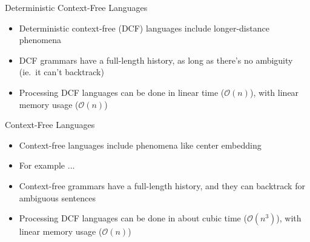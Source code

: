 \documentclass{beamer}
\newcommand{\detail}[1]{{\color{lightgrey}\small{}#1}}
\begin{document}
\begin{frame}{Deterministic Context-Free Languages}
\begin{block}{}
\begin{itemize}
	\item Deterministic context-free (DCF) languages include longer-distance phenomena
	\item DCF grammars have a full-length history, as long as there's no ambiguity (ie.\ it can't backtrack)
	\pause
	\item Processing DCF languages can be done in linear time \detail{($\mathcal{O}(n)$)}, with linear memory usage \detail{($\mathcal{O}(n)$)}
\end{itemize}
\end{block}
\end{frame}


\begin{frame}{Context-Free Languages}
\begin{block}{}
\begin{itemize}
	\item Context-free languages include phenomena like center embedding
	\item For example ...
	\pause
	\item Context-free grammars have a full-length history, and they can backtrack for ambiguous sentences
	\pause
	\item Processing DCF languages can be done in about cubic time \detail{($\mathcal{O}(n^3)$)}, with linear memory usage \detail{($\mathcal{O}(n)$)}
\end{itemize}
\end{block}
\end{frame}
\end{document}
